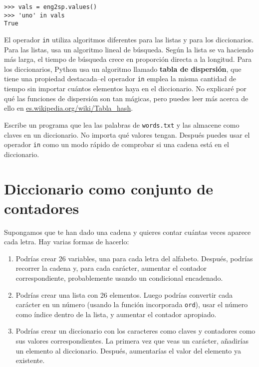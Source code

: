 
\beforeverb
\begin{verbatim}
>>> vals = eng2sp.values()
>>> 'uno' in vals
True
\end{verbatim}
\afterverb
%
El operador {\tt in} utiliza algoritmos diferentes para las listas y
para los diccionarios. Para las listas, usa un algoritmo lineal de búsqueda.
Según la lista se va haciendo más larga, el tiempo de búsqueda
crece en proporción directa a la longitud.
Para los diccionarios, Python usa un
algoritmo llamado {\bf tabla de dispersión}, que tiene una propiedad destacada--el
operador {\tt in} emplea la misma cantidad de tiempo sin importar cuántos
elementos haya en el diccionario. No explicaré
por qué las funciones de dispersión son tan mágicas,
pero puedes leer más acerca de ello en
\url{es.wikipedia.org/wiki/Tabla_hash}.


\begin{ex}
\label{wordlist2}


Escribe un programa que lea las palabras de {\tt words.txt} y
las almacene como claves en un diccionario. No importa qué
valores tengan. Después puedes usar el operador {\tt in}
como un modo rápido de comprobar si una cadena está en el
diccionario.

\end{ex}


\section{Diccionario como conjunto de contadores}
\label{histogram}


Supongamos que te han dado una cadena y quieres contar cuántas veces
aparece cada letra. Hay varias formas de hacerlo:

\begin{enumerate}

\item Podrías crear 26 variables, una para cada letra del
alfabeto. Después, podrías recorrer la cadena y, para cada
carácter, aumentar el contador correspondiente, probablemente
usando un condicional encadenado.

\item Podrías crear una lista con 26 elementos. Luego podrías
convertir cada carácter en un número (usando la función incorporada
{\tt ord}), usar el número como índice dentro de la lista, y aumentar
el contador apropiado.

\item Podrías crear un diccionario con los caracteres como claves
y contadores como sus valores correspondientes. La primera vez
que veas un carácter, añadirías un elemento al diccionario.
Después, aumentarías el valor del elemento ya existente.

\end{enumerate}

